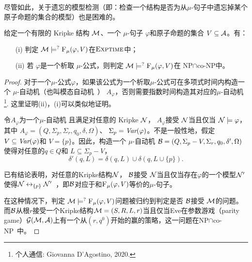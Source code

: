 尽管如此，关于遗忘的模型检测（即：检查一个结构是否为从$\mu$-句子中遗忘掉某个原子命题的集合的模型）也是困难的。
\begin{proposition}[模型检测]\label{chapter06:pro:MC}
	给定一个有限的 Kripke 结构  ${\cal M}$、一个 $\mu$-句子 $\varphi$和原子命题的集合 $V\subseteq {\cal A}$。有：
	\begin{itemize}
		\item[(i)] 判定 ${\cal M} \models^? {\textsc{F}_{\textsc{$\mu$}}}(\varphi, V)$在$\textsc{Exptime}$中；
		\item[(ii)] 若 $\varphi$是一个析取 $\mu$-公式，则判定 ${\cal M} \models^? {\textsc{F}_{\textsc{$\mu$}}}(\varphi, V)$在 \textsc{NP}$\cap$co-\textsc{NP}中。
	\end{itemize}
\end{proposition}
\begin{proof}
	对于一个$\mu$-公式$\varphi$，如果该公式为一个析取$\mu$-公式可在多项式时间内构造一个 $\mu$-自动机（也叫模态自动机~\cite{bradfield2018mu}） $A_{\varphi}$，否则需要指数时间构造其对应的$\mu$-自动机\footnote{个人通信: Giovanna D'Agostino, 2020.}.
	这里证明(ii)，(i)可以类似地证明。
	
	令$A_{\varphi}$为一个$\mu$-自动机 且满足对任意的 Kripke ${\cal N}$， %
	$A_{\varphi}$接受 ${\cal N}$当且仅当 ${\cal N} \models \varphi$，其中 $A_{\varphi} = (Q, \Sigma_p, \Sigma_r, q_0, \delta, \Omega)$、 $\Sigma_p = \textit{Var}(\varphi)$。不是一般性地，假定$V \subseteq \textit{Var}(\varphi)$和 $V=\{p\}$。因此，构造一个 $\mu$-自动机 ${\cal B}= (Q, \Sigma_p - V, \Sigma_r, q_0, \delta', \Omega)$使得对任意的$q\in Q$和 $L\subseteq \Sigma_p - V$，
	\[
	\delta'(q, L) = \delta(q, L) \cup \delta(q, L \cup \{p\}).
	\]
	
	已有结论表明，对任意的Kripke结构${\cal N}$， ${\cal B}$接受 ${\cal N}$当且仅当存在$\varphi$的一个模型${\cal N}'$使得${\cal N} \leftrightarrow_{\{p\}} {\cal N}'$~\cite{d1996uniform}，即${\cal B}$对应于和${\textsc{F}_{\textsc{$\mu$}}}(\varphi, V)$等价的$\mu$-句子。
	
	
	在这种情况下，判定 ${\cal M} \models^? {\textsc{F}_{\textsc{$\mu$}}}(\varphi, V)$问题被归约到判定是否 ${\cal B}$接受 ${\cal M}$的问题。
	而${\cal B}$从根$r$接受一个Kripke结构${\cal M}=(S, R,L, r)$当且仅当Eve在参数游戏（parity game）${\cal G}({\cal M}, {\cal A})$上有一个从$(r,q^0)$开始的赢的策略，这一问题在\textsc{NP}$\cap$co-\textsc{NP}~\cite{bradfield2018mu}中。
\end{proof}


